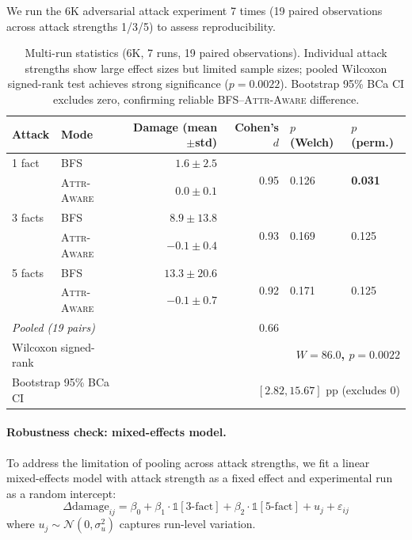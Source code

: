 \documentclass[11pt]{article}
\newcommand{\attraware}{\textsc{Attr-Aware}}
\newcommand{\bfsprop}{\textsc{BFS}}
\begin{document}
We run the 6K adversarial attack experiment 7 times (19 paired observations across attack strengths 1/3/5) to assess reproducibility.

\begin{table}[htbp]
\centering
\small
\begin{tabular}{llrrll}
\toprule
\textbf{Attack} & \textbf{Mode} & \textbf{Damage (mean$\pm$std)} & \textbf{Cohen's $d$} & \textbf{$p$ (Welch)} & \textbf{$p$ (perm.)} \\
\midrule
1 fact & \bfsprop{} & $1.6 \pm 2.5$ & \multirow{2}{*}{0.95} & \multirow{2}{*}{0.126} & \multirow{2}{*}{\textbf{0.031}} \\
       & \attraware{} & $0.0 \pm 0.1$ & & & \\
\midrule
3 facts & \bfsprop{} & $8.9 \pm 13.8$ & \multirow{2}{*}{0.93} & \multirow{2}{*}{0.169} & \multirow{2}{*}{0.125} \\
        & \attraware{} & $-0.1 \pm 0.4$ & & & \\
\midrule
5 facts & \bfsprop{} & $13.3 \pm 20.6$ & \multirow{2}{*}{0.92} & \multirow{2}{*}{0.171} & \multirow{2}{*}{0.125} \\
        & \attraware{} & $-0.1 \pm 0.7$ & & & \\
\midrule
\multicolumn{2}{l}{\textit{Pooled (19 pairs)}} & & 0.66 & & \\
\multicolumn{2}{l}{Wilcoxon signed-rank} & \multicolumn{4}{r}{\textbf{$W = 86.0$, $p = 0.0022$}} \\
\multicolumn{2}{l}{Bootstrap 95\% BCa CI} & \multicolumn{4}{r}{$[2.82, 15.67]$ pp (excludes 0)} \\
\bottomrule
\end{tabular}
\caption{Multi-run statistics (6K, 7 runs, 19 paired observations). Individual attack strengths show large effect sizes but limited sample sizes; pooled Wilcoxon signed-rank test achieves strong significance ($p = 0.0022$). Bootstrap 95\% BCa CI excludes zero, confirming reliable BFS--\attraware{} difference.}
\label{tab:multirun}
\end{table}

\paragraph{Robustness check: mixed-effects model.}
To address the limitation of pooling across attack strengths, we fit a linear mixed-effects model with attack strength as a fixed effect and experimental run as a random intercept:
\[
\Delta\text{damage}_{ij} = \beta_0 + \beta_1 \cdot \mathbb{1}[\text{3-fact}] + \beta_2 \cdot \mathbb{1}[\text{5-fact}] + u_j + \varepsilon_{ij}
\]
where $u_j \sim \mathcal{N}(0, \sigma^2_u)$ captures run-level variation.
\end{document}
